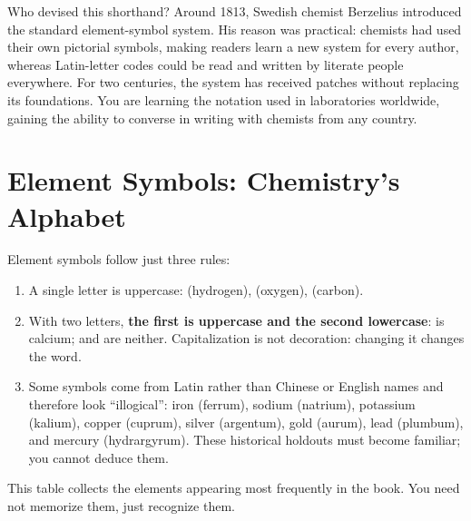 Who devised this shorthand? Around 1813, Swedish chemist Berzelius introduced the standard element-symbol system. His reason was practical: chemists had used their own pictorial symbols, making readers learn a new system for every author, whereas Latin-letter codes could be read and written by literate people everywhere. For two centuries, the system has received patches without replacing its foundations. You are learning the notation used in laboratories worldwide, gaining the ability to converse in writing with chemists from any country.

\section{Element Symbols: Chemistry's Alphabet}

Element symbols follow just three rules:

\begin{enumerate}[itemsep=2pt]
\item A single letter is uppercase:  (hydrogen),  (oxygen),  (carbon).
\item With two letters, \textbf{the first is uppercase and the second lowercase}:  is calcium;  and  are neither. Capitalization is not decoration: changing it changes the word.
\item Some symbols come from Latin rather than Chinese or English names and therefore look ``illogical'': iron  (ferrum), sodium  (natrium), potassium  (kalium), copper  (cuprum), silver  (argentum), gold  (aurum), lead  (plumbum), and mercury  (hydrargyrum). These historical holdouts must become familiar; you cannot deduce them.
\end{enumerate}

This table collects the elements appearing most frequently in the book. You need not memorize them, just recognize them.

